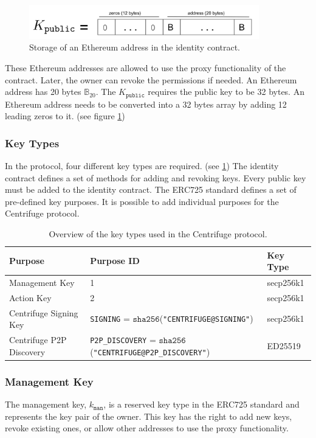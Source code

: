 \begin{figure}[thpb]
  \centering
  \includegraphics[width=10cm]{img/address.png}
  \caption{Storage of an Ethereum address in the identity contract.} 
  \label{fig:address}
\end{figure}
These Ethereum addresses are allowed to use the proxy functionality of the contract. Later, the owner can revoke the permissions if needed. An Ethereum address has 20 bytes $\mathbb{B}_{20}$. The $K_\texttt{public}$ requires the public key to be 32 bytes. An Ethereum address needs to be converted into a 32 bytes array by adding 12 leading zeros to it. (see figure \ref{fig:address})

\subsubsection{Key Types}\label{sec:key_types}
In the protocol, four different key types are required. (see \ref{tab:keys}) The identity contract defines a set of methods for adding and revoking keys.  Every public key must be added to the identity contract. The ERC725 standard defines a set of pre-defined key purposes. It is possible to add individual purposes for the Centrifuge protocol.
\begin{table}[!htbp]
\label{tab:keys}%
\centering
\begin{tabular}{|l|l|l|}
\hline
 \textbf{Purpose}       & \textbf{Purpose ID} & \textbf{Key Type} \\ \hline
Management Key &      1      &          secp256k1 \\ \hline
Action Key    &      2      &            secp256k1     \\ \hline
Centrifuge Signing Key   &       \texttt{SIGNING} = $\mathtt{sha256}$(\texttt{"CENTRIFUGE@SIGNING"})     &            secp256k1    \\ \hline
Centrifuge P2P Discovery &    \texttt{P2P\_DISCOVERY} = $\mathtt{sha256}$(\texttt{"CENTRIFUGE@P2P\_DISCOVERY"})         &            ED25519 \\ \hline
\end{tabular}
\caption{Overview of the key types used in the Centrifuge protocol.}
\end{table}

\subsubsection{Management Key}
The management key, $k_\mathtt{man}$, is a reserved key type in the ERC725 standard and represents the key pair of the owner. This key has the right to add new keys, revoke existing ones, or allow other addresses to use the proxy functionality.
